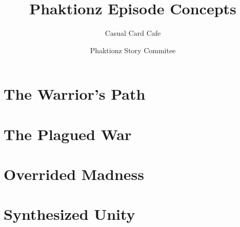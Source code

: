 \documentclass[12pt, letterpaper]{article}
\title{Phaktionz Episode Concepts}
\author{Casual Card Cafe}
\date{Phaktionz Story Commitee}
\begin{document}
\maketitle
{}
\newpage
\tableofcontents
\newpage
\section{The Warrior's Path}

\newpage
\section{The Plagued War}

\newpage
\section{Overrided Madness}

\newpage
\section{Synthesized Unity}

\end{document}
